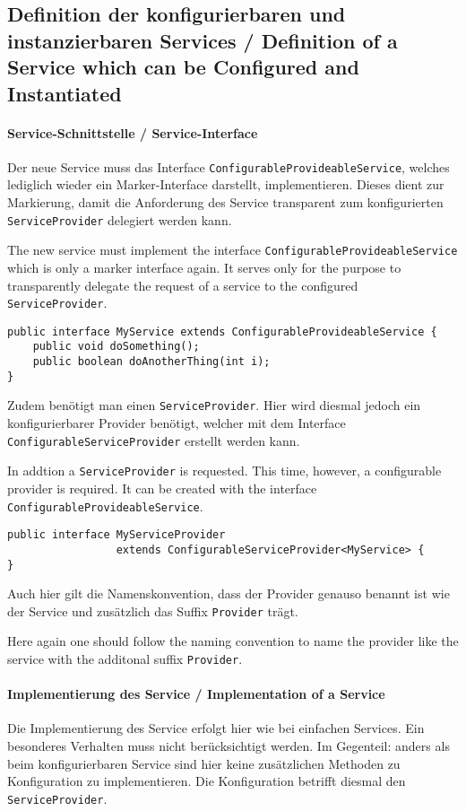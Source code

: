 \documentclass[10pt,a4paper]{scrartcl}
\providecommand{\deng}[2]{#1 / {\sffamily #2}}
\providecommand{\deutsch}[1]{#1}
\providecommand{\englisch}[1]{{\sffamily #1}}
\begin{document}
\subsection{\deng{Definition der konfigurierbaren und instanzierbaren Services}{Definition of a Service which can be Configured and Instantiated}}

\paragraph{\deng{Service-Schnittstelle}{Service-Interface}}
\deutsch{Der neue Service muss das Interface
\texttt{ConfigurableProvideableService}, welches lediglich wieder ein
Marker-Interface darstellt, implementieren. Dieses dient zur Markierung, damit
die Anforderung des Service transparent zum konfigurierten
\texttt{ServiceProvider} delegiert werden kann.}

\englisch{The new service must implement the interface
\texttt{ConfigurableProvideableService} which is only a marker interface again.
It serves only for the purpose to transparently delegate the request of a
service to the configured \texttt{ServiceProvider}.}

\begin{lstlisting}
public interface MyService extends ConfigurableProvideableService {
	public void doSomething();
	public boolean doAnotherThing(int i);
}
\end{lstlisting}

\deutsch{Zudem benötigt man einen \texttt{ServiceProvider}. Hier wird diesmal
jedoch ein konfigurierbarer Provider benötigt, welcher mit dem Interface
\texttt{ConfigurableServiceProvider} erstellt werden kann.}


\englisch{In addtion a \texttt{ServiceProvider} is requested. This time, however,
a configurable provider is required. It can be created with the interface
\texttt{ConfigurableProvideableService}.}

\begin{lstlisting}
public interface MyServiceProvider
                 extends ConfigurableServiceProvider<MyService> {
}
\end{lstlisting}
\deutsch{Auch hier gilt die Namenskonvention, dass der Provider genauso benannt
ist wie der Service und zusätzlich das Suffix \texttt{Provider} trägt.}

\englisch{Here again one should follow the naming convention to name the 
provider like the service with the additonal suffix \texttt{Provider}.}

\paragraph{\deng{Implementierung des Service}{Implementation of a Service}}
\deutsch{Die Implementierung des Service erfolgt hier wie bei einfachen Services. Ein
besonderes Verhalten muss nicht berücksichtigt werden. Im Gegenteil: anders als
beim konfigurierbaren Service sind hier keine zusätzlichen Methoden zu
Konfiguration zu implementieren. Die Konfiguration betrifft diesmal den
\texttt{ServiceProvider}.}
\end{document}
